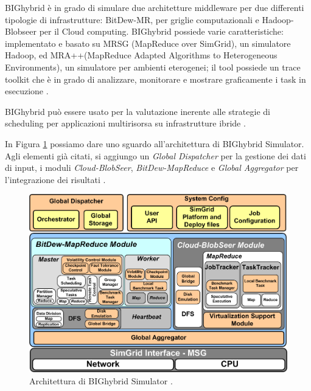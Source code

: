 \documentclass[11pt]{article}
\begin{document}
BIGhybrid è in grado di simulare due architetture middleware per due differenti tipologie di infrastrutture: BitDew-MR, per griglie computazionali e Hadoop-Blobseer per il Cloud computing. BIGhybrid possiede varie caratteristiche: implementato e basato su MRSG (MapReduce over SimGrid), un simulatore Hadoop, ed MRA++(MapReduce Adapted Algorithms to Heterogeneous Environments), un simulatore per ambienti eterogenei; il tool possiede un trace toolkit che è in grado di analizzare, monitorare e mostrare graficamente i task in esecuzione \cite{6972028}.

BIGhybrid può essere usato per la valutazione inerente alle strategie di scheduling per applicazioni multirisorsa su infrastrutture ibride \cite{6972028}.

In Figura \ref{bighybridarch} possiamo dare uno sguardo all'architettura di BIGhybrid Simulator. Agli elementi già citati, si aggiungo un \emph{Global Dispatcher} per la gestione dei dati di input, i moduli \emph{Cloud-BlobSeer}, \emph{BitDew-MapReduce} e \emph{Global Aggregator} per l'integrazione dei risultati \cite{6972028}.

\begin{figure}[H]
	\centering
	\includegraphics[scale=0.40]{images/bighybridarch.png}
	\caption{Architettura di BIGhybrid Simulator \cite{6972028}.}
	\label{bighybridarch}
\end{figure}

\newpage
\end{document}
